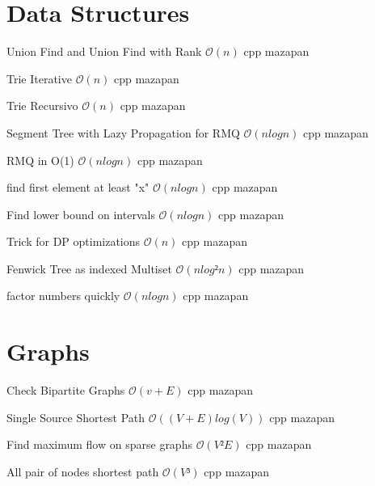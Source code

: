 \section{Data Structures}

{Union Find and Union Find with Rank}
{$\mathcal{O}(n)$}
{cpp}{}
{mazapan}

{Trie Iterative}
{$\mathcal{O}(n)$}
{cpp}{}
{mazapan}

{Trie Recursivo}
{$\mathcal{O}(n)$}
{cpp}{}
{mazapan}

{Segment Tree with Lazy Propagation for RMQ}
{$\mathcal{O}(nlogn)$}
{cpp}{}
{mazapan}

{RMQ in O(1)}
{$\mathcal{O}(nlogn)$}
{cpp}{}
{mazapan}

{find first element at least "x"}
{$\mathcal{O}(nlogn)$}
{cpp}{}
{mazapan}

{Find lower bound on intervals}
{$\mathcal{O}(nlogn)$}
{cpp}{}
{mazapan}

{Trick for DP optimizations}
{$\mathcal{O}(n)$}
{cpp}{}
{mazapan}

{Fenwick Tree as indexed Multiset}
{$\mathcal{O}(nlog²n)$}
{cpp}{}
{mazapan}

{factor numbers quickly}
{$\mathcal{O}(nlogn)$}
{cpp}{}
{mazapan}

\section{Graphs}

{Check Bipartite Graphs}
{$\mathcal{O}(v + E)$}
{cpp}{}
{mazapan}

{Single Source Shortest Path}
{$\mathcal{O}((V + E)log(V))$}
{cpp}{}
{mazapan}

{Find maximum flow on sparse graphs}
{$\mathcal{O}(V²E)$}
{cpp}{}
{mazapan}


{All pair of nodes shortest path}
{$\mathcal{O}(V³)$}
{cpp}{}
{mazapan}

